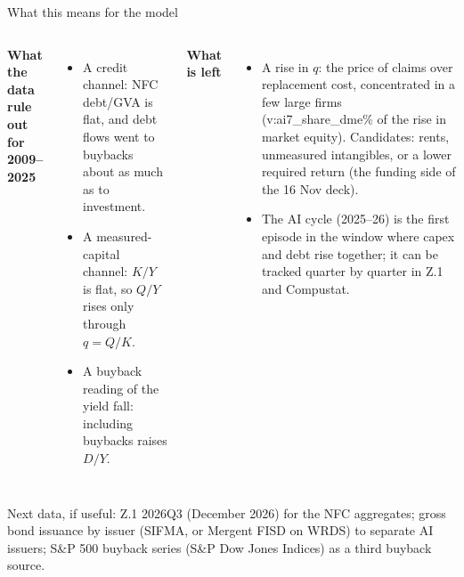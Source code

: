 \documentclass[aspectratio=169,10pt,t]{beamer}
\newcommand{\val}[1]{\csname v:#1\endcsname}
\begin{document}
\begin{frame}{What this means for the model}
\vspace{0.15cm}
\begin{columns}[T]
{\small
\textbf{What the data rule out for 2009--2025}
\begin{itemize}\setlength{\itemsep}{0.12cm}
\item A credit channel: NFC debt/GVA is flat, and debt flows went to buybacks about as much as to investment.
\item A measured-capital channel: $K/Y$ is flat, so $Q/Y$ rises only through $q=Q/K$.
\item A buyback reading of the yield fall: including buybacks raises $D/Y$.
\end{itemize}}
{\small
\textbf{What is left}
\begin{itemize}\setlength{\itemsep}{0.12cm}
\item A rise in $q$: the price of claims over replacement cost, concentrated in a few large firms (\val{ai7_share_dme}\% of the rise in market equity). Candidates: rents, unmeasured intangibles, or a lower required return (the funding side of the 16 Nov deck).
\item The AI cycle (2025--26) is the first episode in the window where capex and debt rise together; it can be tracked quarter by quarter in Z.1 and Compustat.
\end{itemize}}
\end{columns}
\vfill
{\small\textcolor{inksec}{Next data, if useful: Z.1 2026Q3 (December 2026) for the NFC aggregates; gross bond issuance by issuer (SIFMA, or Mergent FISD on WRDS) to separate AI issuers; S\&P 500 buyback series (S\&P Dow Jones Indices) as a third buyback source.}}
\vspace{0.4cm}
\end{frame}
\end{document}
